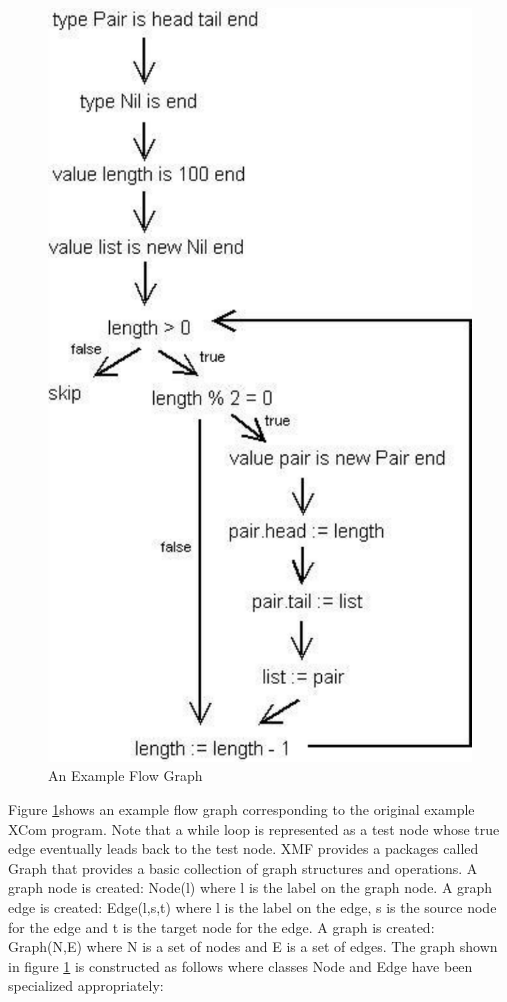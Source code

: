 %
\begin{figure}
\begin{center}

\includegraphics[width=12cm]{LanguageEngineering/Commands/Images/Program}

\caption{\label{fig:An-Example-Flow}An Example Flow Graph}

\end{center}
\end{figure}


Figure \ref{fig:An-Example-Flow}shows an example flow graph corresponding
to the original example XCom program. Note that a while loop is represented
as a test node whose true edge eventually leads back to the test node.
XMF provides a packages called Graph that provides a basic collection
of graph structures and operations. A graph node is created: Node(l)
where l is the label on the graph node. A graph edge is created: 
Edge(l,s,t) where l is the label on the edge,
s is the source node for the edge and 
t is the target node for the edge. A graph is created: 
Graph(N,E) where N is a set of nodes and
E is a set of edges. The graph shown in figure
\ref{fig:An-Example-Flow} is constructed as follows where classes
Node and Edge have been
specialized appropriately:

